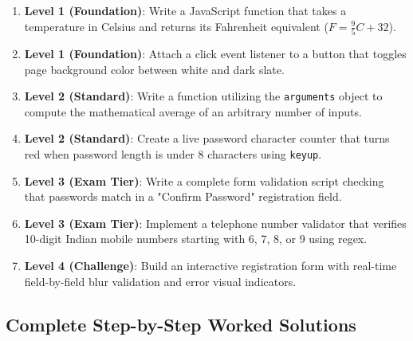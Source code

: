 \begin{practiceset}
\begin{enumerate}[leftmargin=1.5em]
    \item \textbf{Level 1 (Foundation)}: Write a JavaScript function that takes a temperature in Celsius and returns its Fahrenheit equivalent ($F = \frac{9}{5}C + 32$).
    \item \textbf{Level 1 (Foundation)}: Attach a click event listener to a button that toggles page background color between white and dark slate.
    \item \textbf{Level 2 (Standard)}: Write a function utilizing the \texttt{arguments} object to compute the mathematical average of an arbitrary number of inputs.
    \item \textbf{Level 2 (Standard)}: Create a live password character counter that turns red when password length is under 8 characters using \texttt{keyup}.
    \item \textbf{Level 3 (Exam Tier)}: Write a complete form validation script checking that passwords match in a "Confirm Password" registration field.
    \item \textbf{Level 3 (Exam Tier)}: Implement a telephone number validator that verifies 10-digit Indian mobile numbers starting with 6, 7, 8, or 9 using regex.
    \item \textbf{Level 4 (Challenge)}: Build an interactive registration form with real-time field-by-field blur validation and error visual indicators.
\end{enumerate}
\end{practiceset}

\subsection{Complete Step-by-Step Worked Solutions}

